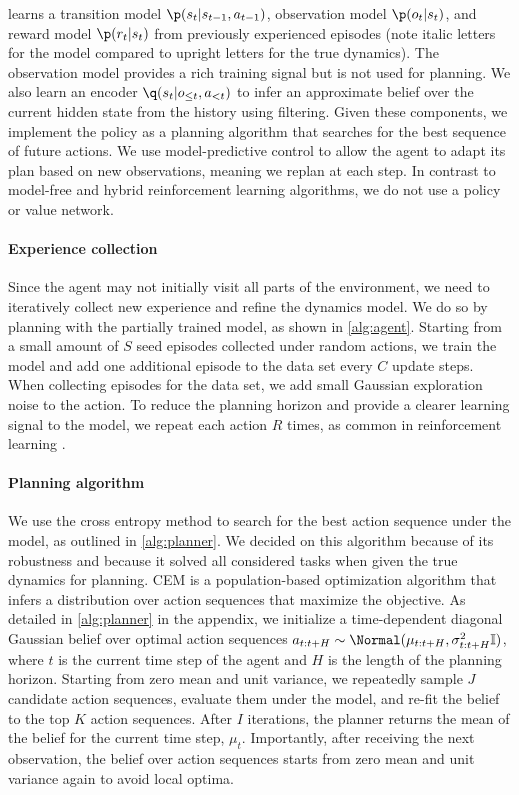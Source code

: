 \method learns a transition model $\p(s_t|s_{t-1},a_{t-1})$, observation model $\p(o_t|s_t)$, and reward model $\p(r_t|s_t)$ from previously experienced episodes (note italic letters for the model compared to upright letters for the true dynamics). The observation model provides a rich training signal but is not used for planning. We also learn an encoder $\q(s_t|o_{\leq t},a_{<t})$ to infer an approximate belief over the current hidden state from the history using filtering. Given these components, we implement the policy as a planning algorithm that searches for the best sequence of future actions. We use model-predictive control \citep[MPC;][]{richards2005mpc} to allow the agent to adapt its plan based on new observations, meaning we replan at each step. In contrast to model-free and hybrid reinforcement learning algorithms, we do not use a policy or value network.

\paragraph{Experience collection}

Since the agent may not initially visit all parts of the environment, we need to iteratively collect new experience and refine the dynamics model. We do so by planning with the partially trained model, as shown in \cref{alg:agent}. Starting from a small amount of $S$ seed episodes collected under random actions, we train the model and add one additional episode to the data set every $C$ update steps. When collecting episodes for the data set, we add small Gaussian exploration noise to the action. To reduce the planning horizon and provide a clearer learning signal to the model, we repeat each action $R$ times, as common in reinforcement learning \citep{mnih2015dqn,mnih2016a3c}.

\paragraph{Planning algorithm}

We use the cross entropy method \citep[CEM;][]{rubinstein1997cem,chua2018pets} to search for the best action sequence under the model, as outlined in \cref{alg:planner}. We decided on this algorithm because of its robustness and because it solved all considered tasks when given the true dynamics for planning. CEM is a population-based optimization algorithm that infers a distribution over action sequences that maximize the objective. As detailed in \cref{alg:planner} in the appendix, we initialize a time-dependent diagonal Gaussian belief over optimal action sequences $a_{t:t+H}\sim\Normal(\mu_{t:t+H},\sigma^2_{t:t+H}\mathbb{I})$, where $t$ is the current time step of the agent and $H$ is the length of the planning horizon. Starting from zero mean and unit variance, we repeatedly sample $J$ candidate action sequences, evaluate them under the model, and re-fit the belief to the top $K$ action sequences. After $I$ iterations, the planner returns the mean of the belief for the current time step, $\mu_t$. Importantly, after receiving the next observation, the belief over action sequences starts from zero mean and unit variance again to avoid local optima.

